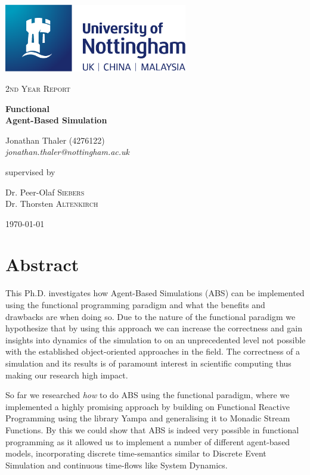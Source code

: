 \documentclass[oneside]{book}
\begin{document}
\begin{titlepage}
	\centering
	\includegraphics[width=0.60\textwidth]{./logo/UoN_Primary_Logo_RGB.png}\par\vspace{1cm}
	{\scshape\Large 2nd Year Report\par}
	\vspace{1.5cm}
	{\huge\bfseries Functional \\ Agent-Based Simulation\par}
	\vspace{2cm}
	{\Large Jonathan Thaler (4276122) \\ \itshape jonathan.thaler@nottingham.ac.uk \par}
	\vfill
	supervised by\par
	Dr. Peer-Olaf \textsc{Siebers} \\
	Dr. Thorsten \textsc{Altenkirch}

	\vfill

	{\large \today\par}
\end{titlepage}

\cleardoublepage

\section*{Abstract}
This Ph.D. investigates how Agent-Based Simulations (ABS) can be implemented using the functional programming paradigm and what the benefits and drawbacks are when doing so. Due to the nature of the functional paradigm we hypothesize that by using this approach we can increase the correctness and gain insights into dynamics of the simulation to on an unprecedented level not possible with the established object-oriented approaches in the field. The correctness of a simulation and its results is of paramount interest in scientific computing thus making our research high impact.

So far we researched \textit{how} to do ABS using the functional paradigm, where we implemented a highly promising approach by building on Functional Reactive Programming using the library Yampa and generalising it to Monadic Stream Functions. By this we could show that ABS is indeed very possible in functional programming as it allowed us to implement a number of different agent-based models, incorporating discrete time-semantics similar to Discrete Event Simulation and continuous time-flows like System Dynamics.
\end{document}

